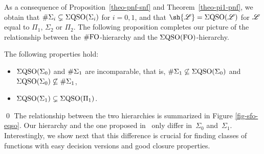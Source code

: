 As a consequence of Proposition~\ref{theo-pnf-snf} and Theorem~\ref{theo-pi1-pnf}, we obtain that $\#\Sigma_{i} \subsetneq \Sigma{\rm QSO}(\Sigma_{i})$ for $i = 0,1$, and that $\sh{\LL} = \eqso(\LL)$ for $\mathscr{L}$ equal to  $\Pi_1$, $\Sigma_2$ or $\Pi_2$. The following proposition completes our picture of the relationship between the $\#{\rm FO}$-hierarchy and the $\Sigma{\rm QSO}({\rm FO})$-hierarchy.
\begin{prop}\label{prop-rest}
The following properties hold:
\begin{itemize}
\item $\Sigma{\rm QSO}(\Sigma_{0})$ and $\#\Sigma_{1}$ are incomparable, that is, $\#\Sigma_{1} \not\subseteq \Sigma{\rm QSO}(\Sigma_{0})$ and $\Sigma{\rm QSO}(\Sigma_{0}) \not\subseteq \#\Sigma_{1}$,
\item $\Sigma{\rm QSO}(\Sigma_{1}) \subsetneq \Sigma{\rm QSO}(\Pi_{1})$.
\end{itemize}
\end{prop}
\proof

\qed
The relationship between the two hierarchies is summarized in Figure \ref{fig-sfo-eqso}.
Our hierarchy and the one proposed in~\cite{SalujaST95} only differ in~$\Sigma_0$ and~$\Sigma_1$. 
Interestingly, we show next that this difference is crucial for finding classes of functions with easy decision versions and good closure properties.